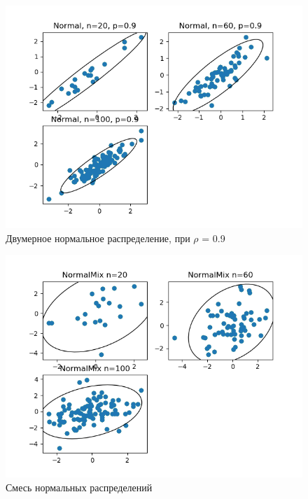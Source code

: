 \documentclass[a4]{article}
\begin{document}
\begin{center}
\begin{figure}[h!]
			\end{figure}
			\newpage
			\begin{figure}[h!]
				\includegraphics[width=\textwidth]{Normal9.png} 
				\caption[Двумерное нормальное распределение, при $\rho$ = 0.9]{Двумерное нормальное распределение, при $\rho$ = 0.9}
			\end{figure}
			\newpage
			\begin{figure}[h!]
				\includegraphics[width=\textwidth]{NormalMix9.png} 
				\caption[Смесь нормальных распределений]{Смесь нормальных распределений}
			\end{figure}
			
		\end{center}
			
\end{document}
